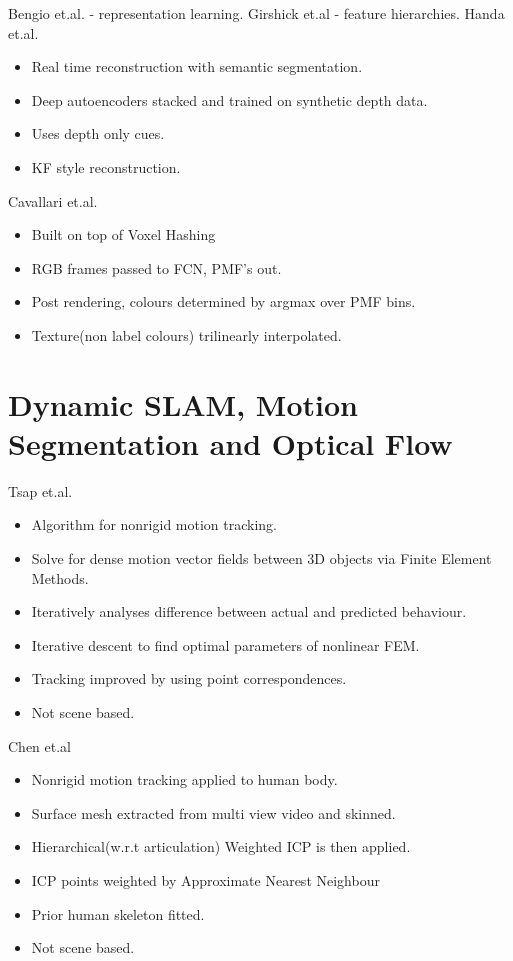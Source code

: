 Bengio et.al. \cite{Bengio2013} - representation learning.
Girshick et.al \cite{Girshick2014} - feature hierarchies.
Handa et.al. \cite{Handa2015}
\begin{itemize}
	\item Real time reconstruction with semantic segmentation.
	\item Deep autoencoders stacked and trained on synthetic depth data.
	\item Uses depth only cues.
	\item KF style reconstruction.
\end{itemize}

Cavallari et.al. \cite{Cavallari2016}
\begin{itemize}
	\item Built on top of Voxel Hashing
	\item RGB frames passed to FCN\cite{Shelhamer2017}, PMF's out.
	\item Post rendering, colours determined by argmax over PMF bins.
	\item Texture(non label colours) trilinearly interpolated.
\end{itemize}

\section{Dynamic SLAM, Motion Segmentation and Optical Flow}
\label{sec:lit_review_dynamic}
Tsap et.al. \cite{Tsap2000}
\begin{itemize}
	\item Algorithm for nonrigid motion tracking.
	\item Solve for dense motion vector fields between 3D objects via Finite Element Methods. %
	\item Iteratively analyses difference between actual and predicted behaviour.
	\item Iterative descent to find optimal parameters of nonlinear FEM.
	\item Tracking improved by using point correspondences.
	\item Not scene based.
\end{itemize}

Chen et.al \cite{Chen2011}
\begin{itemize}
	\item Nonrigid motion tracking applied to human body.
	\item Surface mesh extracted from multi view video and skinned.
	\item Hierarchical(w.r.t articulation) Weighted ICP is then applied.
	\item ICP points weighted by Approximate Nearest Neighbour %
	\item Prior human skeleton fitted.
	\item Not scene based.
\end{itemize}

